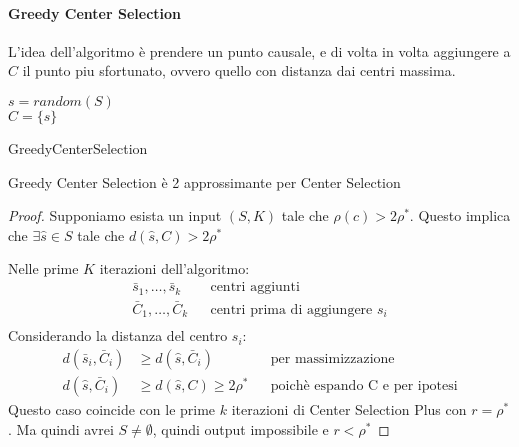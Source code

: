 \paragraph{Greedy Center Selection}
L'idea dell'algoritmo è prendere un punto causale, e di volta in volta 
aggiungere a $C$ il punto piu sfortunato, ovvero quello con distanza dai centri massima.

\begin{algorithm}[H]
    \SetAlgoLined

    $s = \mathit{random}(S)$\\
    $C = \{s\}$\\
     \caption{GreedyCenterSelection}
\end{algorithm}

\begin{theorem}
    Greedy Center Selection è 2 approssimante per Center Selection
\end{theorem}
\begin{proof}
    Supponiamo esista un input $(S,K)$ tale che $\rho(c) > 2\rho^*$.
    Questo implica che $\exists \hat{s} \in S$ tale che $d(\hat{s}, C) > 2\rho^*$ 

    Nelle prime $K$ iterazioni dell'algoritmo:
    \begin{equation}
        \begin{aligned}
            \bar{s}_1, \dots, \bar{s}_k && \text{centri aggiunti}\\
            \bar{C}_1, \dots, \bar{C}_k && \text{centri prima di aggiungere } s_i\\
        \end{aligned}
    \end{equation}
    Considerando la distanza del centro $s_i$:
    \begin{equation}
        \begin{aligned}
            d(\bar{s}_i,\bar{C}_i)&\geq d(\hat{s},\bar{C}_i) && \text{per massimizzazione}\\
            d(\hat{s},\bar{C}_i) &\geq d(\hat{s}, C) \geq 2\rho^* && \text{poichè espando C e per ipotesi}
        \end{aligned}
    \end{equation}
    Questo caso coincide con le prime $k$ iterazioni di Center Selection Plus con $r = \rho^*$.
    Ma quindi avrei $S \neq \emptyset$, quindi output impossibile e $r < \rho^*$
\end{proof}

